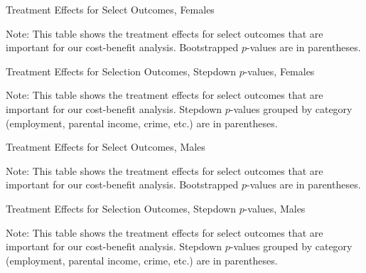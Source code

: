 



\begin{table}[htbp]
\begin{center}
	\caption{Treatment Effects for Select Outcomes, Females}\label{tab:select-female}
		
\end{center}
\raggedright \footnotesize
Note: This table shows the treatment effects for select outcomes that are important for our cost-benefit analysis. Bootstrapped $p$-values are in parentheses.
\end{table}

\begin{table}[htbp]
\begin{center}
	\caption{Treatment Effects for Selection Outcomes, Stepdown $p$-values, Females}\label{tab:select-female-sd}
		
\end{center}
\raggedright \footnotesize
Note: This table shows the treatment effects for select outcomes that are important for our cost-benefit analysis. Stepdown $p$-values grouped by category (employment, parental income, crime, etc.) are in parentheses.
\end{table}

\begin{table}[htbp]
\begin{center}
	\caption{Treatment Effects for Select Outcomes, Males}\label{tab:select-male}
		
\end{center}
\raggedright \footnotesize
Note: This table shows the treatment effects for select outcomes that are important for our cost-benefit analysis. Bootstrapped $p$-values are in parentheses.
\end{table}

\begin{table}[htbp]
\begin{center}
	\caption{Treatment Effects for Selection Outcomes, Stepdown $p$-values, Males}\label{tab:select-male-sd}
		
\end{center}
\raggedright \footnotesize
Note: This table shows the treatment effects for select outcomes that are important for our cost-benefit analysis. Stepdown $p$-values grouped by category (employment, parental income, crime, etc.) are in parentheses.
\end{table}

